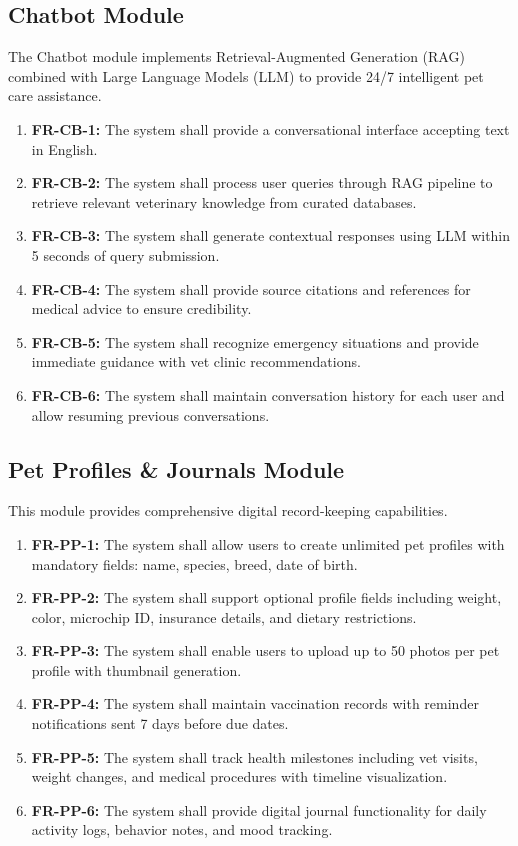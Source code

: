 \subsection{Chatbot Module}
The Chatbot module implements Retrieval-Augmented Generation (RAG) combined with Large Language Models (LLM) to provide 24/7 intelligent pet care assistance.
\begin{enumerate}
    \item \textbf{FR-CB-1:} The system shall provide a conversational interface accepting text in English.
    \item \textbf{FR-CB-2:} The system shall process user queries through RAG pipeline to retrieve relevant veterinary knowledge from curated databases.
    \item \textbf{FR-CB-3:} The system shall generate contextual responses using LLM within 5 seconds of query submission.
    \item \textbf{FR-CB-4:} The system shall provide source citations and references for medical advice to ensure credibility.
    \item \textbf{FR-CB-5:} The system shall recognize emergency situations and provide immediate guidance with vet clinic recommendations.
    \item \textbf{FR-CB-6:} The system shall maintain conversation history for each user and allow resuming previous conversations.
\end{enumerate}

\subsection{Pet Profiles \& Journals Module}
This module provides comprehensive digital record-keeping capabilities.
\begin{enumerate}
    \item \textbf{FR-PP-1:} The system shall allow users to create unlimited pet profiles with mandatory fields: name, species, breed, date of birth.
    \item \textbf{FR-PP-2:} The system shall support optional profile fields including weight, color, microchip ID, insurance details, and dietary restrictions.
    \item \textbf{FR-PP-3:} The system shall enable users to upload up to 50 photos per pet profile with thumbnail generation.
    \item \textbf{FR-PP-4:} The system shall maintain vaccination records with reminder notifications sent 7 days before due dates.
    \item \textbf{FR-PP-5:} The system shall track health milestones including vet visits, weight changes, and medical procedures with timeline visualization.
    \item \textbf{FR-PP-6:} The system shall provide digital journal functionality for daily activity logs, behavior notes, and mood tracking.
\end{enumerate}

